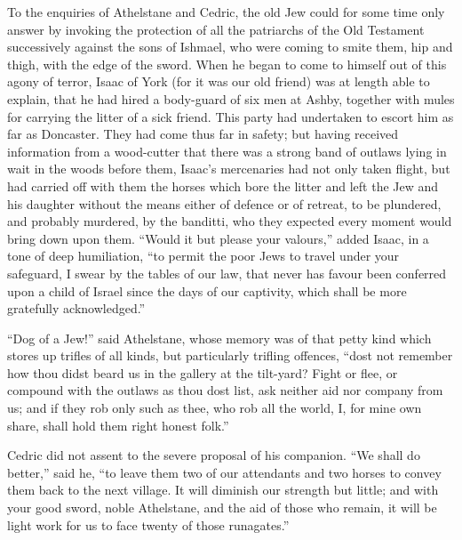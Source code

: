 To the enquiries of Athelstane and Cedric, the old Jew could for some
time only answer by invoking the protection of all the patriarchs of the
Old Testament successively against the sons of Ishmael, who were coming
to smite them, hip and thigh, with the edge of the sword. When he began
to come to himself out of this agony of terror, Isaac of York (for it
was our old friend) was at length able to explain, that he had hired a
body-guard of six men at Ashby, together with mules for carrying the
litter of a sick friend. This party had undertaken to escort him as far
as Doncaster. They had come thus far in safety; but having received
information from a wood-cutter that there was a strong band of outlaws
lying in wait in the woods before them, Isaac's mercenaries had not only
taken flight, but had carried off with them the horses which bore the
litter and left the Jew and his daughter without the means either of
defence or of retreat, to be plundered, and probably murdered, by the
banditti, who they expected every moment would bring down upon them.
``Would it but please your valours,'' added Isaac, in a tone of deep
humiliation, ``to permit the poor Jews to travel under your safeguard, I
swear by the tables of our law, that never has favour been conferred
upon a child of Israel since the days of our captivity, which shall be
more gratefully acknowledged.''

``Dog of a Jew!'' said Athelstane, whose memory was of that petty kind
which stores up trifles of all kinds, but particularly trifling
offences, ``dost not remember how thou didst beard us in the gallery at
the tilt-yard? Fight or flee, or compound with the outlaws as thou dost
list, ask neither aid nor company from us; and if they rob only such as
thee, who rob all the world, I, for mine own share, shall hold them
right honest folk.''

Cedric did not assent to the severe proposal of his companion. ``We
shall do better,'' said he, ``to leave them two of our attendants and
two horses to convey them back to the next village. It will diminish our
strength but little; and with your good sword, noble Athelstane, and the
aid of those who remain, it will be light work for us to face twenty of
those runagates.''

